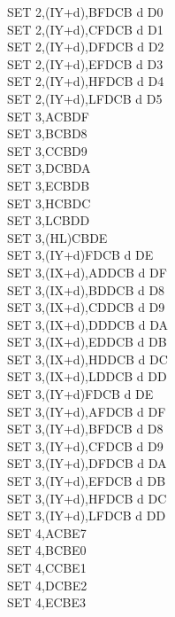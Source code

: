 \begin{multicols}{3}
{\begin{tabbing}
        SET 2,(IY+d),B\UNDOC\>FDCB d D0\\
        SET 2,(IY+d),C\UNDOC\>FDCB d D1\\
        SET 2,(IY+d),D\UNDOC\>FDCB d D2\\
        SET 2,(IY+d),E\UNDOC\>FDCB d D3\\
        SET 2,(IY+d),H\UNDOC\>FDCB d D4\\
        SET 2,(IY+d),L\UNDOC\>FDCB d D5\\
        SET 3,A\>CBDF\\
        SET 3,B\>CBD8\\
        SET 3,C\>CBD9\\
        SET 3,D\>CBDA\\
        SET 3,E\>CBDB\\
        SET 3,H\>CBDC\\
        SET 3,L\>CBDD\\
        SET 3,(HL)\>CBDE\\
        SET 3,(IY+d)\>FDCB d DE\\
        SET 3,(IX+d),A\UNDOC\>DDCB d DF\\
        SET 3,(IX+d),B\UNDOC\>DDCB d D8\\
        SET 3,(IX+d),C\UNDOC\>DDCB d D9\\
        SET 3,(IX+d),D\UNDOC\>DDCB d DA\\
        SET 3,(IX+d),E\UNDOC\>DDCB d DB\\
        SET 3,(IX+d),H\UNDOC\>DDCB d DC\\
        SET 3,(IX+d),L\UNDOC\>DDCB d DD\\
        SET 3,(IY+d)\>FDCB d DE\\
        SET 3,(IY+d),A\UNDOC\>FDCB d DF\\
        SET 3,(IY+d),B\UNDOC\>FDCB d D8\\
        SET 3,(IY+d),C\UNDOC\>FDCB d D9\\
        SET 3,(IY+d),D\UNDOC\>FDCB d DA\\
        SET 3,(IY+d),E\UNDOC\>FDCB d DB\\
        SET 3,(IY+d),H\UNDOC\>FDCB d DC\\
        SET 3,(IY+d),L\UNDOC\>FDCB d DD\\
        SET 4,A\>CBE7\\
        SET 4,B\>CBE0\\
        SET 4,C\>CBE1\\
        SET 4,D\>CBE2\\
        SET 4,E\>CBE3\\

\end{tabbing}}
\end{multicols}
